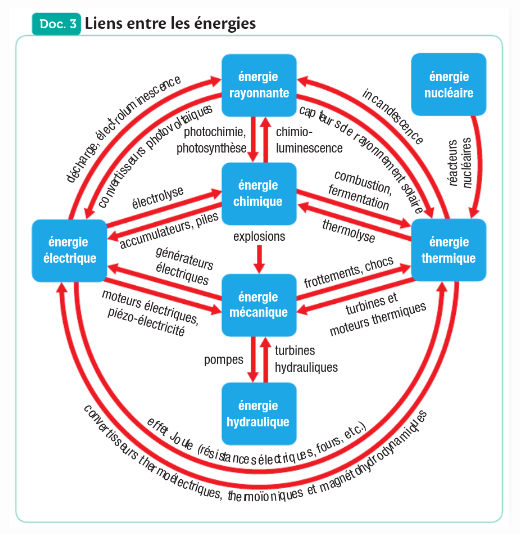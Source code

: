 \documentclass[10pt]{article}
\begin{document}
\begin{minipage}[c]{0.45\textwidth}
	\centering
	\includegraphics[scale=0.38]{assets/doc3.png}
\end{minipage}
\hspace{90pt}
\end{document}
